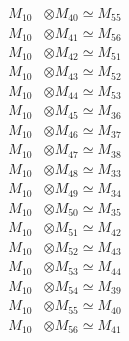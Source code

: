 \begin{align*}
M_{10} &\otimes M_{40} \simeq M_{55} \\
M_{10} &\otimes M_{41} \simeq M_{56} \\
M_{10} &\otimes M_{42} \simeq M_{51} \\
M_{10} &\otimes M_{43} \simeq M_{52} \\
M_{10} &\otimes M_{44} \simeq M_{53} \\
M_{10} &\otimes M_{45} \simeq M_{36} \\
M_{10} &\otimes M_{46} \simeq M_{37} \\
M_{10} &\otimes M_{47} \simeq M_{38} \\
M_{10} &\otimes M_{48} \simeq M_{33} \\
M_{10} &\otimes M_{49} \simeq M_{34} \\
M_{10} &\otimes M_{50} \simeq M_{35} \\
M_{10} &\otimes M_{51} \simeq M_{42} \\
M_{10} &\otimes M_{52} \simeq M_{43} \\
M_{10} &\otimes M_{53} \simeq M_{44} \\
M_{10} &\otimes M_{54} \simeq M_{39} \\
M_{10} &\otimes M_{55} \simeq M_{40} \\
M_{10} &\otimes M_{56} \simeq M_{41} \\
\end{align*}

